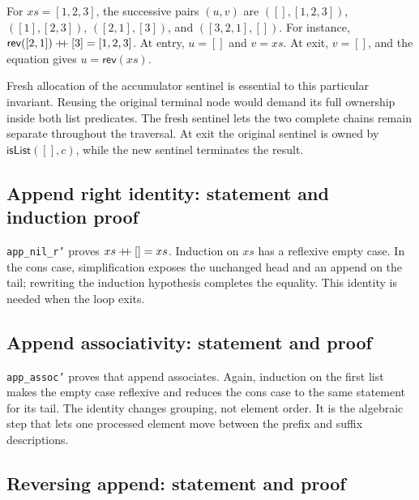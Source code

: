 \documentclass[11pt]{article}
\begin{document}
For \(xs=[1,2,3]\), the successive pairs \((u,v)\) are
\(([],[1,2,3])\), \(([1],[2,3])\), \(([2,1],[3])\), and
\(([3,2,1],[])\). For instance,
\(\mathsf{rev}([2,1])\mathbin{+\mkern-6mu+}[3]=[1,2,3]\).
At entry, \(u=[]\) and \(v=xs\). At exit, \(v=[]\), and the equation gives
\(u=\mathsf{rev}(xs)\).

Fresh allocation of the accumulator sentinel is essential to this particular
invariant. Reusing the original terminal node would demand its full ownership
inside both list predicates. The fresh sentinel lets the two complete chains
remain separate throughout the traversal. At exit the original sentinel is
owned by \(\mathsf{isList}([],c)\), while the new sentinel terminates the result.

\subsection{Append right identity: statement and induction proof}

\begin{minipage}{\linewidth}

\end{minipage}

\texttt{app\_nil\_r'} proves \(xs\mathbin{+\mkern-6mu+}[]=xs\).
Induction on \(xs\) has a reflexive empty case. In the cons case, simplification
exposes the unchanged head and an append on the tail; rewriting the induction
hypothesis completes the equality. This identity is needed when the loop exits.

\subsection{Append associativity: statement and proof}

\begin{minipage}{\linewidth}

\end{minipage}

\texttt{app\_assoc'} proves that append associates. Again, induction on the
first list makes the empty case reflexive and reduces the cons case to the
same statement for its tail. The identity changes grouping, not element order.
It is the algebraic step that lets one processed element move between the
prefix and suffix descriptions.

\subsection{Reversing append: statement and proof}
\end{document}
